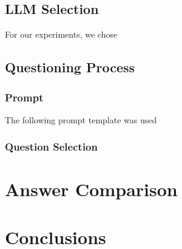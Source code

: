 \documentclass[11pt]{article}
\begin{document}
\subsection{LLM Selection}
For our experiments, we chose

\subsection{Questioning Process}

\subsubsection{Prompt}
The following prompt template was used

\subsubsection{Question Selection}



\section{Answer Comparison}



\section{Conclusions}





\end{document}
